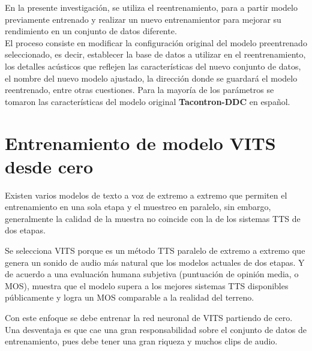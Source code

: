 En la presente investigación, se utiliza el reentrenamiento, para a partir modelo previamente entrenado y realizar un nuevo entrenamientor para mejorar su rendimiento en un conjunto de datos diferente.\\

El proceso consiste en modificar la configuración original del modelo preentrenado seleccionado, es decir, establecer la base de datos a utilizar en el reentrenamiento, los detalles acústicos que reflejen las características del nuevo conjunto de datos, el nombre del nuevo modelo ajustado, la dirección donde se guardará el modelo reentrenado, entre otras cuestiones. Para la mayoría de los parámetros se tomaron las características del modelo original \textbf{Tacontron-DDC} en español.



\section{Entrenamiento de modelo VITS desde cero}

Existen varios modelos de texto a voz de extremo a extremo que permiten el entrenamiento en una sola etapa y el muestreo en paralelo, sin embargo, generalmente la calidad de la muestra no coincide con la de los sistemas TTS de dos etapas. 

Se selecciona VITS porque es un método TTS paralelo de extremo a extremo que genera un sonido de audio más natural que los modelos actuales de dos etapas. Y de acuerdo a una evaluación humana subjetiva (puntuación de opinión media, o MOS), muestra que el modelo supera a los mejores sistemas TTS disponibles públicamente y logra un MOS comparable a la realidad del terreno.

Con este enfoque se debe entrenar la red neuronal de VITS partiendo de cero. Una desventaja es que cae una gran responsabilidad sobre el conjunto de datos de entrenamiento, pues debe tener una gran riqueza y muchos clips de audio.
	
	







